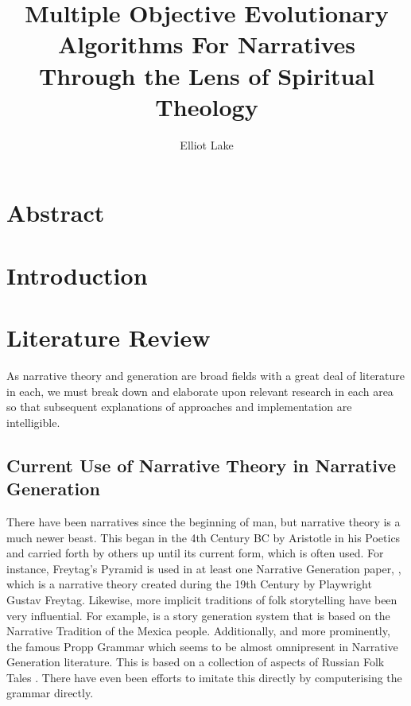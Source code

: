 \documentclass[11pt]{article}
\author{Elliot Lake}
\title{Multiple Objective Evolutionary Algorithms For Narratives Through the Lens of Spiritual Theology}
\begin{document}
\maketitle

\section{Abstract}

\section{Introduction}

\section{Literature Review}
As narrative theory and generation are broad fields with a great deal of literature in each, we must break down and elaborate upon relevant research in each area so that subsequent explanations of approaches and implementation are intelligible.

\subsection{Current Use of Narrative Theory in Narrative Generation}
There have been narratives since the beginning of man, but narrative theory is a much newer beast. This began in the 4th Century BC by Aristotle in his Poetics and carried forth by others up until its current form, which is often used.  For instance, Freytag's Pyramid is used in at least one Narrative Generation paper, \cite{questgeneration}, which is a narrative theory created during the 19th Century by Playwright Gustav Freytag. Likewise, more implicit traditions of folk storytelling have been very influential. For example, \cite{MEXICA} is a story generation system that is based on the Narrative Tradition of the Mexica people. Additionally, and more prominently, the famous Propp Grammar which seems to be almost omnipresent in Narrative Generation literature. This is based on a collection of aspects of Russian Folk Tales \cite{propp1975morphology}. There have even been efforts to imitate this directly by computerising the grammar directly\cite{Gervs2013ProppsMO}. \\
\end{document}
